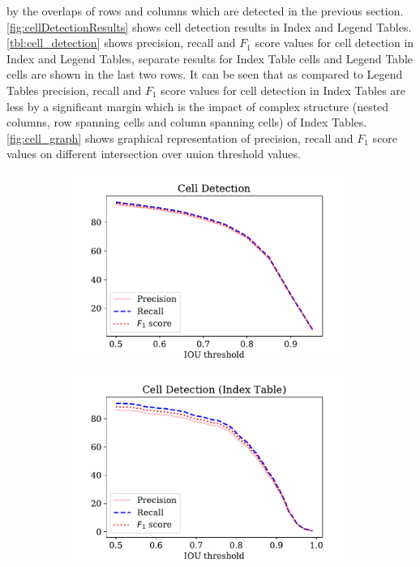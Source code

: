 by the overlaps of rows and columns which are detected in the previous section. \autoref{fig:cellDetectionResults} shows cell detection results in Index and Legend Tables. \autoref{tbl:cell_detection} shows precision, recall and $F_1$ score values for cell detection in Index and Legend Tables, separate results for Index Table cells and Legend Table cells are shown in the last two rows. It can be seen that as compared to Legend Tables precision, recall and $F_1$ score values for cell detection in Index Tables are less by a significant margin which is the impact of complex structure (nested columns, row spanning cells and column spanning cells) of Index Tables. \autoref{fig:cell_graph} shows graphical representation of precision, recall and $F_1$ score values on different intersection over union threshold values.
\begin{figure}[h!]
\centering
\begin{subfigure}{0.325\linewidth}
  \centering
  \includegraphics[width=\linewidth]{cell_pRf.pdf}
    \caption{}
    \label{}
\end{subfigure}
\begin{subfigure}{0.325\linewidth}
  \centering
  \includegraphics[width=\linewidth]{cell_index_pRf.pdf}

\end{subfigure}
\end{figure}

